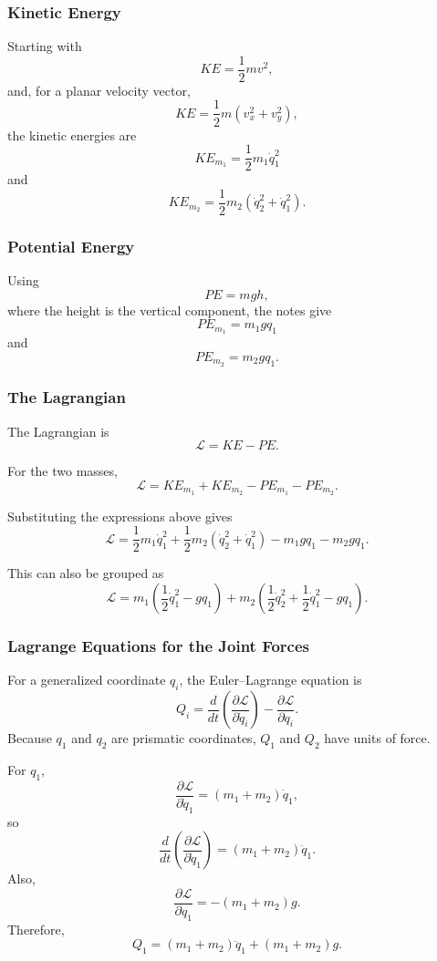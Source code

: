 \documentclass[11pt]{article}
\begin{document}
\subsubsection{Kinetic Energy}

Starting with
\[
KE=\frac{1}{2}mv^2,
\]
and, for a planar velocity vector,
\[
KE=\frac{1}{2}m\left(v_x^2+v_y^2\right),
\]
the kinetic energies are
\[
KE_{m_1}=\frac{1}{2}m_1\dot q_1^2
\]
and
\[
KE_{m_2}
=
\frac{1}{2}m_2\left(\dot q_2^2+\dot q_1^2\right).
\]

\subsubsection{Potential Energy}

Using
\[
PE=mgh,
\]
where the height is the vertical component, the notes give
\[
PE_{m_1}=m_1gq_1
\]
and
\[
PE_{m_2}=m_2gq_1.
\]

\subsubsection{The Lagrangian}

The Lagrangian is
\[
\mathcal{L}=KE-PE.
\]

For the two masses,
\[
\mathcal{L}
=
KE_{m_1}+KE_{m_2}-PE_{m_1}-PE_{m_2}.
\]

Substituting the expressions above gives
\[
\boxed{
\mathcal{L}
=
\frac{1}{2}m_1\dot q_1^2
+
\frac{1}{2}m_2\left(\dot q_2^2+\dot q_1^2\right)
-
m_1gq_1
-
m_2gq_1
}.
\]

This can also be grouped as
\[
\mathcal{L}
=
m_1\left(\frac{1}{2}\dot q_1^2-gq_1\right)
+
m_2\left(
\frac{1}{2}\dot q_2^2
+
\frac{1}{2}\dot q_1^2
-
gq_1
\right).
\]

\subsubsection{Lagrange Equations for the Joint Forces}

For a generalized coordinate $q_i$, the Euler--Lagrange equation is
\[
Q_i
=
\frac{d}{dt}
\left(
\frac{\partial\mathcal{L}}{\partial\dot q_i}
\right)
-
\frac{\partial\mathcal{L}}{\partial q_i}.
\]
Because $q_1$ and $q_2$ are prismatic coordinates, $Q_1$ and $Q_2$ have units of force.

For $q_1$,
\[
\frac{\partial\mathcal{L}}{\partial\dot q_1}
=(m_1+m_2)\dot q_1,
\]
so
\[
\frac{d}{dt}
\left(
\frac{\partial\mathcal{L}}{\partial\dot q_1}
\right)
=(m_1+m_2)\ddot q_1.
\]
Also,
\[
\frac{\partial\mathcal{L}}{\partial q_1}
=-(m_1+m_2)g.
\]
Therefore,
\[
\boxed{
Q_1=(m_1+m_2)\ddot q_1+(m_1+m_2)g
}.
\]
\end{document}
